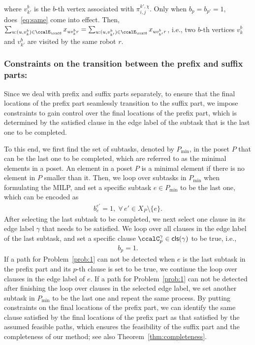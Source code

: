 \documentclass[Afour,sageh,times]{sagej}
\newcommand{\clause}[1]{\mathsf{cls}(#1)}
\newcommand{\aap}[4]{\mathcal{\pi}_{{#1},{#2}}^{#3,#4}}
\begin{document}
{{{{{\begin{subequations}
\begin{align}
  \end{align}
\end{subequations}
\endgroup
where $v_{k'}^b$ is the $b$-th vertex associated with $\aap{i}{j}{k'}{\chi}$. Only when $b_p = b_{p'}=1$, does~\eqref{eq:same} come into effect. Then, $\sum\nolimits_{u:(u, v_k^b) \in \ccalE_\ccalG} x_{u v_k^b r} = \sum\nolimits_{u:(u, v_{k'}^b) \in \ccalE_\ccalG} x_{u v_{k'}^b r} $, i.e., two $b$-th vertices $v_k^b$ and $v_{k'}^b$ are visited by the same robot $r$.

\subsubsection{Constraints on the transition between the prefix and suffix parts:}\label{sec:transition} Since we deal with prefix and suffix parts separately, to ensure that the final locations of the prefix part seamlessly transition to the suffix part, we impose constraints to gain control over  the final locations of the prefix part, which is determined by the satisfied clause in the edge label of the  subtask that is the last one to be completed.

To this end,  we first find the set of subtasks, denoted by $P_{\text{min}}$, in the poset $P$ that can be the last one to be completed, which are referred to as the minimal elements in a poset. An element in a poset $P$  is a minimal element if there is no element in $P$ smaller than it. Then, we loop over subtasks in $P_{\text{min}}$ when formulating the MILP, and set a specific subtask $e\in P_{\text{min}}$ to be the last one, which can be encoded as
\begin{align}\label{eq:lastsubtask0}
  b_e^{e'} = 1, \;  \forall\, e' \in X_P \setminus\{e\}.
\end{align}
After selecting the last subtask to be completed, we next select one clause in its edge label $\gamma$ that needs to be satisfied. We loop over all clauses in the edge label of the last subtask, and set a specific clause $\ccalC_p^\gamma \in \clause{\gamma}$ to be true, i.e.,
\begin{align}\label{eq:lastclause}
  b_p = 1.
\end{align}
If a path for Problem~\ref{prob:1} can not be detected when  $e$ is the last subtask in the prefix part  and its $p$-th clause is set to be true,  we continue the loop over clauses in the edge label of $e$. If a path for Problem~\ref{prob:1} can not be detected after finishing the loop over clauses in the selected edge label, we set another subtask in $P_{\text{min}}$ to be the last one and repeat the same process. By putting constraints on the final locations of the prefix part, we can identify the same clause satisfied by the final locations of the prefix part as that satisfied by the assumed feasible paths, which ensures the feasibility of  the suffix part and the completeness of our method; see also Theorem~\ref{thm:completeness}.

}}}}}
\end{document}
